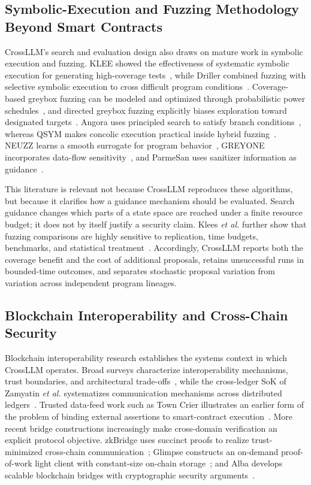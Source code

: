 \documentclass[journal]{IEEEtran}
\theoremstyle{definition}
\begin{document}
\subsection{Symbolic-Execution and Fuzzing Methodology Beyond Smart Contracts}

CrossLLM's search and evaluation design also draws on mature work in symbolic execution and fuzzing. KLEE showed the effectiveness of systematic symbolic execution for generating high-coverage tests~\cite{cadar2008klee}, while Driller combined fuzzing with selective symbolic execution to cross difficult program conditions~\cite{stephens2016driller}. Coverage-based greybox fuzzing can be modeled and optimized through probabilistic power schedules~\cite{bohme2016aflfast}, and directed greybox fuzzing explicitly biases exploration toward designated targets~\cite{bohme2017aflgo}. Angora uses principled search to satisfy branch conditions~\cite{chen2018angora}, whereas QSYM makes concolic execution practical inside hybrid fuzzing~\cite{yun2018qsym}. NEUZZ learns a smooth surrogate for program behavior~\cite{she2019neuzz}, GREYONE incorporates data-flow sensitivity~\cite{gan2020greyone}, and ParmeSan uses sanitizer information as guidance~\cite{osterlund2020parmesan}.

This literature is relevant not because CrossLLM reproduces these algorithms, but because it clarifies how a guidance mechanism should be evaluated. Search guidance changes which parts of a state space are reached under a finite resource budget; it does not by itself justify a security claim. Klees \emph{et al.} further show that fuzzing comparisons are highly sensitive to replication, time budgets, benchmarks, and statistical treatment~\cite{klees2018evaluating}. Accordingly, CrossLLM reports both the coverage benefit and the cost of additional proposals, retains unsuccessful runs in bounded-time outcomes, and separates stochastic proposal variation from variation across independent program lineages.

\subsection{Blockchain Interoperability and Cross-Chain Security}

Blockchain interoperability research establishes the systems context in which CrossLLM operates. Broad surveys characterize interoperability mechanisms, trust boundaries, and architectural trade-offs~\cite{belchior2021survey}, while the cross-ledger SoK of Zamyatin \emph{et al.} systematizes communication mechanisms across distributed ledgers~\cite{zamyatin2021sok}. Trusted data-feed work such as Town Crier illustrates an earlier form of the problem of binding external assertions to smart-contract execution~\cite{zhang2016towncrier}. More recent bridge constructions increasingly make cross-domain verification an explicit protocol objective. zkBridge uses succinct proofs to realize trust-minimized cross-chain communication~\cite{xie2022zkbridge}; Glimpse constructs an on-demand proof-of-work light client with constant-size on-chain storage~\cite{scaffino2023glimpse}; and Alba develops scalable blockchain bridges with cryptographic security arguments~\cite{scaffino2025alba}.
\end{document}
